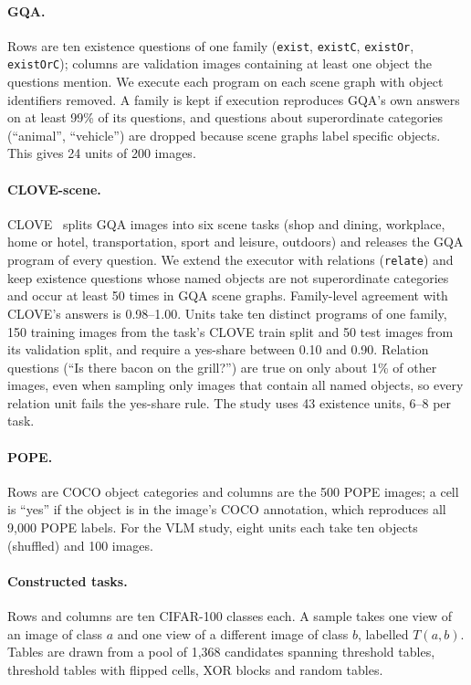 \paragraph{GQA.}
Rows are ten existence questions of one family (\texttt{exist}, \texttt{existC},
\texttt{existOr}, \texttt{existOrC}); columns are validation images containing at least one
object the questions mention. We execute each program on each scene graph with object
identifiers removed. A family is kept if execution reproduces GQA's own answers on at least
99\% of its questions, and questions about superordinate categories (``animal'', ``vehicle'')
are dropped because scene graphs label specific objects. This gives 24 units of 200 images.

\paragraph{CLOVE-scene.}
CLOVE~\cite{lei2023symbolic} splits GQA images into six scene tasks (shop and dining,
workplace, home or hotel, transportation, sport and leisure, outdoors) and releases the GQA
program of every question. We extend the executor with relations (\texttt{relate}) and keep
existence questions whose named objects are not superordinate categories and occur at least
50 times in GQA scene graphs. Family-level agreement with CLOVE's answers is 0.98--1.00. Units
take ten distinct programs of one family, 150 training images from the task's CLOVE train
split and 50 test images from its validation split, and require a yes-share between 0.10 and
0.90. Relation questions (``Is there bacon on the grill?'') are true on only about 1\% of
other images, even when sampling only images that contain all named objects, so every
relation unit fails the yes-share rule. The study uses 43 existence units, 6--8 per task.

\paragraph{POPE.}
Rows are COCO object categories and columns are the 500 POPE images; a cell is ``yes'' if the
object is in the image's COCO annotation, which reproduces all 9{,}000 POPE labels. For the VLM
study, eight units each take ten objects (shuffled) and 100 images.

\paragraph{Constructed tasks.}
Rows and columns are ten CIFAR-100 classes each. A sample takes one view of an image of class
$a$ and one view of a different image of class $b$, labelled $T(a,b)$. Tables are drawn from a
pool of 1{,}368 candidates spanning threshold tables, threshold tables with flipped cells, XOR
blocks and random tables.

